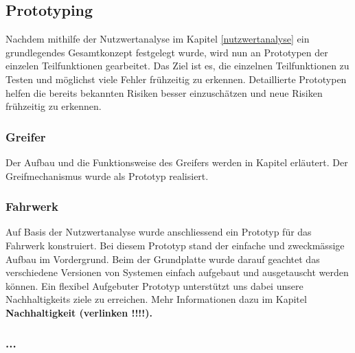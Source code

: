 \subsection{Prototyping}

Nachdem mithilfe der Nutzwertanalyse im Kapitel \ref{nutzwertanalyse} ein grundlegendes Gesamtkonzept festgelegt wurde, wird nun an Prototypen der einzelen Teilfunktionen gearbeitet.   Das Ziel ist es, die einzelnen Teilfunktionen zu Testen und möglichst viele Fehler frühzeitig zu erkennen. Detaillierte Prototypen helfen die bereits bekannten Risiken besser einzuschätzen und neue Risiken frühzeitig zu erkennen.

\subsubsection{Greifer}
\label{subsubsection:Greifer}


Der Aufbau und die Funktionsweise des Greifers werden in Kapitel erläutert. Der Greifmechanismus wurde als Prototyp realisiert.



\subsubsection{Fahrwerk}

Auf Basis der Nutzwertanalyse wurde anschliessend ein Prototyp für das Fahrwerk konstruiert. Bei diesem Prototyp stand der einfache und zweckmässige Aufbau im Vordergrund. Beim der Grundplatte wurde darauf geachtet das verschiedene  Versionen von Systemen einfach aufgebaut und ausgetauscht werden können. Ein flexibel Aufgebuter Prototyp unterstützt uns dabei unsere Nachhaltigkeits ziele zu erreichen. Mehr Informationen dazu im Kapitel \textbf{Nachhaltigkeit (verlinken !!!!).} 

\subsubsection{...}

